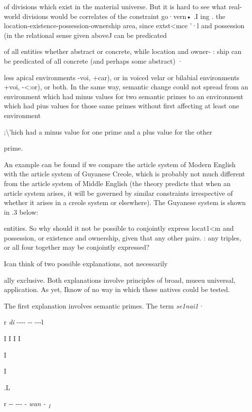 of divisions which exist in the material universe. But it is hard to see what real{}-world divisions would be correlates of the constraint go·vern• .I ing . the location-existence-possession-ownership area, since extst{\textless}mce '·l and possession (in the relational sense given aboveJ can be predicated

of all entities whether abstract or concrete, while location and owner- : ship can be predicated of all concrete (and perhaps some abstract) ·


less apical environments {}-voi, +car), or in voiced velar or bilabial environments +voi, {}-{\textless}:or), or both. In the same way, semantic change could not spread from an environment which had minus values for two semantic primes to an environment which had pius values for those same primes without first affecting at least one environment

;{\textbackslash}'hich had a minus value for one prime and a plus value for the other

prime.

An example can be found if we compare the article system of Modern English with the article system of Guyanese Creole, which is probably not much different from the article system of Middle English (the theory predicts that when an article system arises, it will be governed by similar constraints irrespective of whether it arises in a creole system or elsewhere). The Guyanese system is shown in .3 below:

entities. So why should it not be possible to conjointly express locat1{\textless}m and possession, or existence and ownership, given that any other µairs. : any triples, or all four together may be conjointly expressed?

Ican think of two possible explanations, not necessarily

ally exclusive. Both explanations involve principles of broad, mueeu universal, application. As yet, Iknow of no way in which these natives could be tested.

The first explanation involves semantic primes. The term \textit{se1nai1·}

r \textit{di} {}-{}-{}-{}- {}-{}- {}-{}-{}-l

I I I I

I

I

.L

r {}-{}- {}-{}-{}- {}- \textit{wan} \textit{{}-} \textit{\textsubscript{1}}


